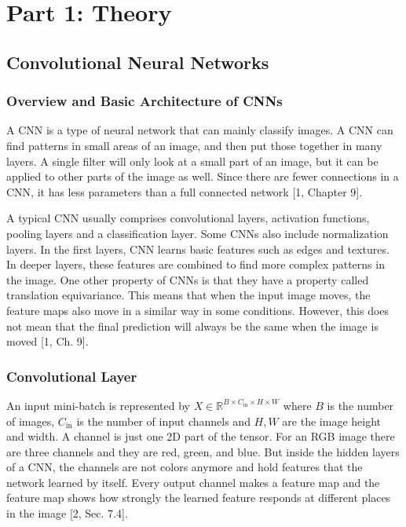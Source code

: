 \documentclass[11pt,a4paper]{article}
\begin{document}
\begingroup
\renewcommand{\thesubsection}{\arabic{subsection}}
\renewcommand{\thesubsubsection}{\thesubsection.\arabic{subsubsection}}
\setcounter{subsection}{0}
\setcounter{secnumdepth}{3}
\section*{Part 1: Theory}

\subsection{Convolutional Neural Networks}\label{theory:2.2}

\subsubsection{Overview and Basic Architecture of CNNs}\label{theory:2.2.1}

A CNN is a type of neural network that can mainly classify images. A CNN can find patterns in small areas of an image, and then put those together in many layers. A single filter will only look at a small part of an image, but it can be applied to other parts of the image as well. Since there are fewer connections in a CNN, it has less parameters than a full connected network [1, Chapter 9].

A typical CNN usually comprises convolutional layers, activation functions, pooling layers and a classification layer. Some CNNs also include normalization layers. In the first layers, CNN learns basic features such as edges and textures. In deeper layers, these features are combined to find more complex patterns in the image. One other property of CNNs is that they have a property called translation equivariance. This means that when the input image moves, the feature maps also move in a similar way in some conditions. However, this does not mean that the final prediction will always be the same when the image is moved [1, Ch. 9].

\subsubsection{Convolutional Layer}\label{theory:2.2.2}

An input mini-batch is represented by \(X\in {\mathbb{R}}^{B\times {C}_{\mathrm{in}}\times H\times W}\) where \(B\) is the number of images, \({C}_{\mathrm{in}}\) is the number of input channels and \(H,W\) are the image height and width. A channel is just one 2D part of the tensor. For an RGB image there are three channels and they are red, green, and blue. But inside the hidden layers of a CNN, the channels are not colors anymore and hold features that the network learned by itself. Every output channel makes a feature map and the feature map shows how strongly the learned feature responds at different places in the image [2, Sec. 7.4].
\end{document}
